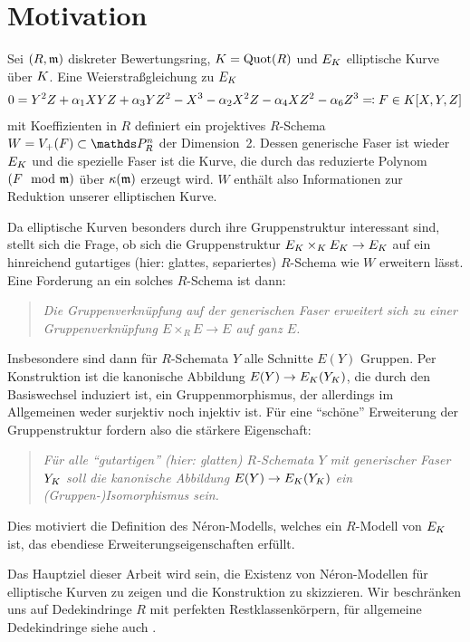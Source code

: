 \chapter{Motivation}

Sei $(R,\mathfrak{m})$ diskreter Bewertungsring, $K=\operatorname{Quot}(R)$ und $E_{K}$
elliptische Kurve über $K$. Eine Weierstraßgleichung zu $E_{K}$
\begin{gather*}
  0 = Y^2 Z + \alpha_1 XYZ + \alpha_3 YZ^2 - X^3 - \alpha_2X^2 Z - \alpha_4 XZ^2 - \alpha_6 Z^3
  \eqqcolon F\in K[X,Y,Z]  
\end{gather*}
mit Koeffizienten in $R$ definiert ein projektives $R$-Schema
$W=V_+(F)\subset\P_R^n$ der Dimension~2. Dessen generische Faser
ist wieder $E_{K}$ und die spezielle Faser ist die Kurve, die durch das
reduzierte Polynom $(F\mod{\mathfrak{m}})$ über $\kappa(\mathfrak{m})$ erzeugt wird.
$W$ enthält also Informationen zur Reduktion unserer elliptischen
Kurve.

Da elliptische Kurven besonders durch ihre Gruppenstruktur
interessant sind, stellt sich die Frage, ob sich die
Gruppenstruktur $E_{K}\times_{K} E_{K}\to E_{K}$ auf ein hinreichend
gutartiges (hier: glattes, separiertes) $R$-Schema wie $W$ erweitern
lässt.
Eine Forderung an ein solches $R$-Schema ist dann:
\begin{quote}
  \itshape
  Die Gruppenverknüpfung auf der generischen Faser erweitert sich zu
  einer Gruppenverknüpfung $E\times_R E\to E$ auf ganz $E$.
\end{quote}
Insbesondere sind dann für $R$-Schemata $Y$ alle Schnitte $E(Y)$
Gruppen. Per Konstruktion ist die kanonische Abbildung
$E(Y)\to E_{K}(Y_{K})$, die durch den Basiswechsel induziert ist, ein
Gruppenmorphismus, der allerdings im Allgemeinen weder surjektiv noch
injektiv ist. Für eine \enquote{schöne} Erweiterung der
Gruppenstruktur fordern also die stärkere Eigenschaft:
\begin{quote}
  \itshape
  Für alle \enquote{gutartigen} (hier: glatten) $R$-Schemata $Y$ mit
  generischer Faser $Y_{K}$ soll die kanonische Abbildung
  $E(Y)\to E_{K}(Y_{K})$ ein (Gruppen-)Isomorphismus sein.
\end{quote}
Dies motiviert die Definition des Néron-Modells, welches
ein $R$-Modell von $E_{K}$ ist, das ebendiese Erweiterungseigenschaften
erfüllt.

Das Hauptziel dieser Arbeit wird sein, die Existenz von Néron-Modellen
für elliptische Kurven zu zeigen und die Konstruktion zu skizzieren.
Wir beschränken uns auf Dedekindringe $R$ mit perfekten
Restklassenkörpern, für allgemeine Dedekindringe siehe auch
\cite{nonperfect}.

